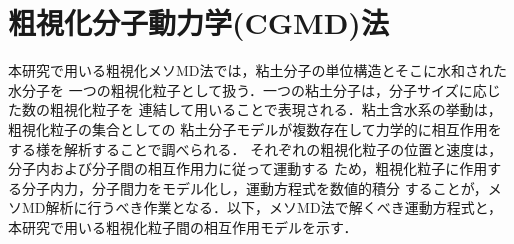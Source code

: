 ﻿%
\section{粗視化分子動力学(CGMD)法}
本研究で用いる粗視化メソMD法では，粘土分子の単位構造とそこに水和された水分子を
一つの粗視化粒子として扱う．一つの粘土分子は，分子サイズに応じた数の粗視化粒子を
連結して用いることで表現される．粘土含水系の挙動は，粗視化粒子の集合としての
粘土分子モデルが複数存在して力学的に相互作用をする様を解析することで調べられる．
それぞれの粗視化粒子の位置と速度は，分子内および分子間の相互作用力に従って運動する
ため，粗視化粒子に作用する分子内力，分子間力をモデル化し，運動方程式を数値的積分
することが，メソMD解析に行うべき作業となる．以下，メソMD法で解くべき運動方程式と，
本研究で用いる粗視化粒子間の相互作用モデルを示す．\\

